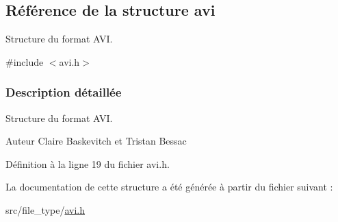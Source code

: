 \hypertarget{a00158}{}\subsection{Référence de la structure avi}
\label{a00158}


Structure du format A\+VI.  




{\ttfamily \#include $<$avi.\+h$>$}



\subsubsection{Description détaillée}
Structure du format A\+VI. 

\begin{DoxyAuthor}{Auteur}
Claire Baskevitch et Tristan Bessac 
\end{DoxyAuthor}


Définition à la ligne 19 du fichier avi.\+h.



La documentation de cette structure a été générée à partir du fichier suivant \+:\begin{DoxyCompactItemize}
\item 
src/file\+\_\+type/\hyperlink{a00071}{avi.\+h}\end{DoxyCompactItemize}

